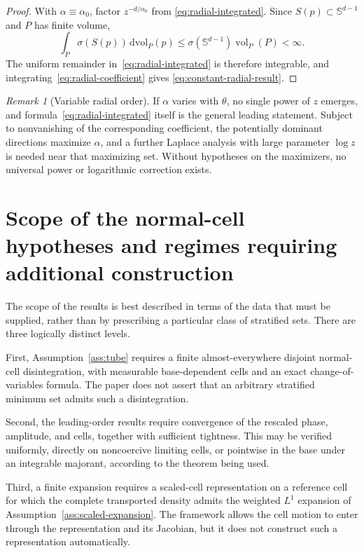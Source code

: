 \documentclass[11pt]{amsart}
\numberwithin{equation}{section}
\theoremstyle{definition}
\theoremstyle{remark}
\newtheorem{remark}[theorem]{Remark}
\newcommand{\dvol}{\,\mathrm{dvol}}
\newcommand{\vol}{\operatorname{vol}}
\begin{document}
\begin{proof}
With $\alpha\equiv\alpha_0$, factor $z^{-d/\alpha_0}$ from
\eqref{eq:radial-integrated}.  Since $S(p)\subset\mathbb S^{d-1}$ and $P$
has finite volume,
\[
 \int_P\sigma(S(p))\dvol_P(p)
 \le\sigma(\mathbb S^{d-1})\vol_P(P)<\infty.
\]
The uniform remainder in~\eqref{eq:radial-integrated} is therefore integrable,
and integrating~\eqref{eq:radial-coefficient} gives
\eqref{eq:constant-radial-result}.
\end{proof}

\begin{remark}[Variable radial order]
If $\alpha$ varies with $\theta$, no single power of $z$ emerges, and
formula~\eqref{eq:radial-integrated} itself is the general leading statement.  Subject to
nonvanishing of the corresponding coefficient, the potentially dominant
directions maximize $\alpha$, and a further Laplace analysis with large
parameter $\log z$ is needed near that maximizing set.  Without hypotheses
on the maximizers, no universal power or logarithmic correction exists.
\end{remark}

\section{Scope of the normal-cell hypotheses and regimes requiring
additional construction}
\label{sec:geometric-scope}

The scope of the results is best described in terms of the data that must be
supplied, rather than by prescribing a particular class of stratified sets.
There are three logically distinct levels.

First, Assumption~\ref{ass:tube} requires a finite almost-everywhere disjoint
normal-cell disintegration, with measurable base-dependent cells and an exact
change-of-variables formula.  The paper does not assert that an arbitrary
stratified minimum set admits such a disintegration.

Second, the leading-order results require convergence of the rescaled phase,
amplitude, and cells, together with sufficient tightness.  This may be verified
uniformly, directly on noncoercive limiting cells, or pointwise in the base
under an integrable majorant, according to the theorem being used.

Third, a finite expansion requires a scaled-cell representation on a reference
cell for which the complete transported density admits the weighted
$L^1$ expansion of Assumption~\ref{ass:scaled-expansion}.  The framework allows
the cell motion to enter through the representation and its Jacobian, but it
does not construct such a representation automatically.
\end{document}
